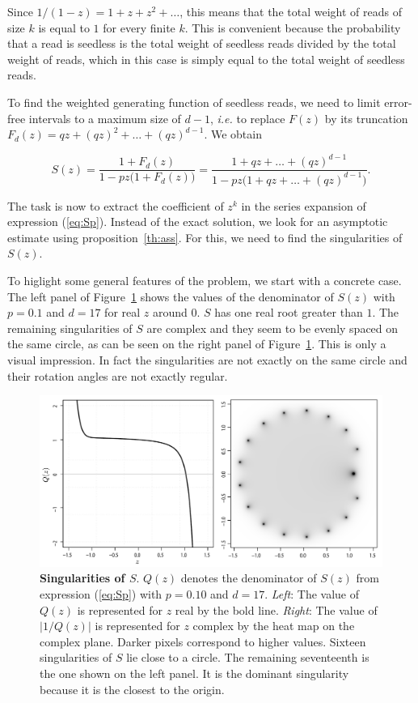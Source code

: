 \documentclass{article}
\begin{document}
Since $1/(1-z) = 1+z+z^2 + \ldots$, this means that the total weight of
reads of size $k$ is equal to $1$ for every finite $k$. This is convenient
because the probability that a read is seedless is the total weight of
seedless reads divided by the total weight of reads, which in this case is
simply equal to the total weight of seedless reads.

To find the weighted generating function of seedless reads, we need to
limit error-free intervals to a maximum size of $d-1$, \textit{i.e.} to
replace $F(z)$ by its truncation $F_d(z) = qz + (qz)^2 + \ldots
+ (qz)^{d-1}$. We obtain

\begin{equation}
\label{eq:Sp}
S(z) = \frac{1+F_d(z)}{1-pz\big( 1+F_d(z) \big)} =
\frac{1+qz + \ldots + (qz)^{d-1}}{1-pz \big(1+qz + \ldots +
(qz)^{d-1} \big)}.
\end{equation}

The task is now to extract the coefficient of $z^k$ in the series
expansion of expression (\ref{eq:Sp}). Instead of the exact solution, we
look for an asymptotic estimate using proposition~\ref{th:ass}. For this,
we need to find the singularities of $S(z)$.

To higlight some general features of the problem, we start with a concrete
case. The left panel of Figure~\ref{fig:plotQ} shows the values of the
denominator of $S(z)$ with $p=0.1$ and $d=17$ for real $z$ around $0$. $S$
has one real root greater than $1$.  The remaining singularities of $S$
are complex and they seem to be evenly spaced on the same circle, as can
be seen on the right panel of Figure~\ref{fig:plotQ}.  This is only a
visual impression.  In fact the singularities are not exactly on the same
circle and their rotation angles are not exactly regular.

\begin{figure}[h]
\centering
\includegraphics[scale=0.4]{singularityS.pdf}
\caption{\textbf{Singularities of $S$}. $Q(z)$ denotes the
denominator of $S(z)$ from expression (\ref{eq:Sp}) with $p=0.10$ and
$d=17$. \textit{Left}: The value of $Q(z)$ is represented for $z$ real by
the bold line. \textit{Right}: The value of $|1/Q(z)|$ is represented for
$z$ complex by the heat map on the complex plane. Darker pixels correspond
to higher values. Sixteen singularities of $S$ lie close to a circle. The
remaining seventeenth is the one shown on the left panel. It is the
dominant singularity because it is the closest to the origin.}
\label{fig:plotQ}
\end{figure}
\end{document}
